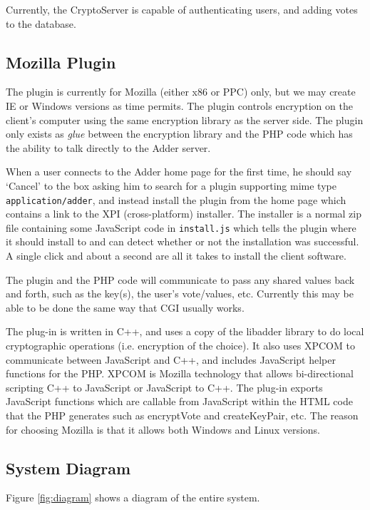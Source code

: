 \documentclass[letterpaper,10pt]{article}
\begin{document}
Currently, the CryptoServer is capable of authenticating users, and
adding votes to the database.

\subsection{Mozilla Plugin}

The plugin is currently for Mozilla (either x86 or PPC) only, but we
may create IE or Windows versions as time permits. The plugin controls
encryption on the client's computer using the same encryption library
as the server side. The plugin only exists as \emph{glue} between the
encryption library and the PHP code which has the ability to talk
directly to the Adder server.

When a user connects to the Adder home page for the first time, he
should say `Cancel' to the box asking him to search for a plugin
supporting mime type \texttt{application/adder}, and instead install
the plugin from the home page which contains a link to the XPI
(cross-platform) installer. The installer is a normal zip file
containing some JavaScript code in \texttt{install.js} which tells the
plugin where it should install to and can detect whether or not the
installation was successful. A single click and about a second are all
it takes to install the client software.

The plugin and the PHP code will communicate to pass any shared values
back and forth, such as the key(s), the user's vote/values, etc.
Currently this may be able to be done the same way that CGI usually
works.

The plug-in is written in C++, and uses a copy of the libadder library
to do local cryptographic operations (i.e. encryption of the choice).
It also uses XPCOM to communicate between JavaScript and C++, and
includes JavaScript helper functions for the PHP. XPCOM is Mozilla
technology that allows bi-directional scripting C++ to JavaScript or
JavaScript to C++. The plug-in exports JavaScript functions which are
callable from JavaScript within the HTML code that the PHP generates
such as encryptVote and createKeyPair, etc. The reason for
choosing Mozilla is that it allows both Windows and Linux versions.

\subsection{System Diagram}
Figure \ref{fig:diagram} shows a diagram of the entire system.
\end{document}
